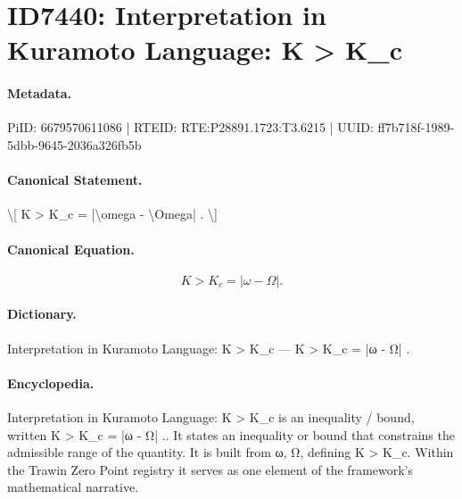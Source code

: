\section*{ID7440: Interpretation in Kuramoto Language: K > K\_c}
\paragraph{Metadata.}
PiID: 6679570611086 | RTEID: RTE:P28891.1723:T3.6215 | UUID: ff7b718f-1989-5dbb-9645-2036a326fb5b

\paragraph{Canonical Statement.}
\textbackslash{}[ K > K\_c = |\textbackslash{}omega - \textbackslash{}Omega| . \textbackslash{}]

\paragraph{Canonical Equation.}
\[
K > K_c = |\omega - \Omega| .
\]

\paragraph{Dictionary.}
Interpretation in Kuramoto Language: K > K\_c — K > K\_c = |ω - Ω| .

\paragraph{Encyclopedia.}
Interpretation in Kuramoto Language: K > K\_c is an inequality / bound, written K > K\_c = |ω - Ω| .. It states an inequality or bound that constrains the admissible range of the quantity. It is built from ω, Ω, defining K > K\_c. Within the Trawin Zero Point registry it serves as one element of the framework's mathematical narrative.

